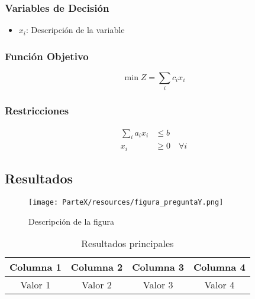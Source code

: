 \subsubsection*{Variables de Decisión}
\begin{itemize}
    \item $x_i$: Descripción de la variable
\end{itemize}

\subsubsection*{Función Objetivo}
\begin{equation}
    \min Z = \sum_{i} c_i x_i
\end{equation}

\subsubsection*{Restricciones}
\begin{align}
    \sum_{i} a_i x_i &\leq b \\
    x_i &\geq 0 \quad \forall i
\end{align}

\subsection*{Resultados}

\begin{figure}[H]
    \centering
    \texttt{[image: ParteX/resources/figura\_preguntaY.png]}
    \caption{Descripción de la figura}
    \label{fig:parteX-preguntaY-figura}
\end{figure}

\begin{table}[H]
    \centering
    \caption{Resultados principales}
    \label{tab:parteX-preguntaY-resultados}
    \begin{tabular}{|c|c|c|c|}
        \hline
        \textbf{Columna 1} & \textbf{Columna 2} & \textbf{Columna 3} & \textbf{Columna 4} \\
        \hline
        Valor 1 & Valor 2 & Valor 3 & Valor 4 \\
        \hline
    \end{tabular}
\end{table}


